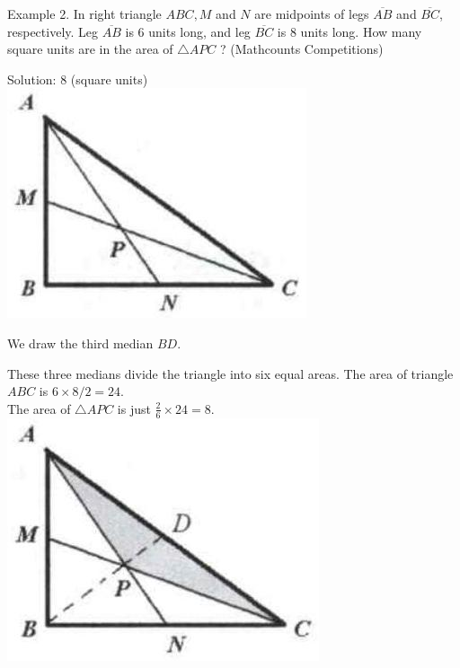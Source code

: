 \documentclass[10pt]{article}
\begin{document}
Example 2. In right triangle \(A B C, M\) and \(N\) are midpoints of legs \(\overline{A B}\) and \(\overline{B C}\), respectively. Leg \(\overline{A B}\) is 6 units long, and leg \(\overline{B C}\) is 8 units long. How many square units are in the area of \(\triangle A P C\) ? (Mathcounts Competitions)

Solution: 8 (square units)\\
\includegraphics[max width=\textwidth, center]{2025_04_17_97bc1f7e44d93c271a88g-009(1)}

We draw the third median \(B D\).

These three medians divide the triangle into six equal areas. The area of triangle \(A B C\) is \(6 \times 8 / 2=24\).\\
The area of \(\triangle A P C\) is just \(\frac{2}{6} \times 24=8\).\\
\includegraphics[max width=\textwidth, center]{2025_04_17_97bc1f7e44d93c271a88g-009}
\end{document}
